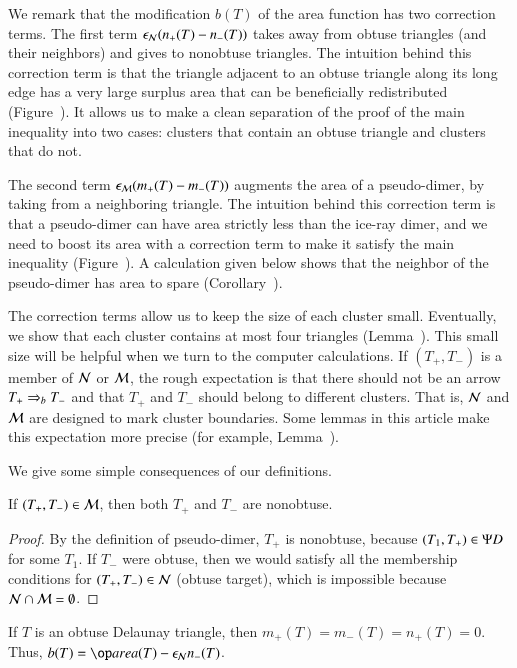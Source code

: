 We remark that the modification $b(T)$ of the area function has two
correction terms.  The first term $\epsilon_{\mathcal N} (n_+(T) - n_-(T))$ takes away
from obtuse triangles (and their neighbors) and gives to nonobtuse
triangles.  The intuition behind this correction term is that the
triangle adjacent to an obtuse triangle along its long edge has a very
large surplus area that can be beneficially redistributed
(Figure~).  It allows us to make a clean separation of
the proof of the main inequality into two cases: clusters that contain
an obtuse triangle and clusters that do not.

The second term $\epsilon_{\mathcal M} (m_+(T) - m_-(T))$ augments the area of a
pseudo-dimer, by taking from a neighboring triangle.  The intuition
behind this correction term is that a pseudo-dimer can have area
strictly less than the ice-ray dimer, and we need to boost its area
with a correction term to make it satisfy the main inequality
(Figure~).  A calculation given below shows that
the neighbor of the pseudo-dimer has area to spare
(Corollary~).

The correction terms allow us to keep the size of each cluster small.
Eventually, we show that each cluster contains at most four triangles
(Lemma~).  This small size will be helpful when we
turn to the computer calculations.  If $(T_+,T_-)$ is a member of $\mathcal N$
or $\mathcal M$, the rough expectation is that there should not be an arrow
$T_+\Rightarrow_{b} T_-$ and that $T_+$ and $T_-$ should belong to different
clusters.  That is, $\mathcal N$ and $\mathcal M$ are designed to mark cluster
boundaries.  Some lemmas in this article make this expectation more
precise (for example, Lemma~).

We give some simple consequences of our definitions.

\begin{lemma} 
  If $(T_+,T_-)\in \mathcal M$, then both $T_+$ and $T_-$ are nonobtuse.
\end{lemma}

\begin{proof} 
  By the definition of pseudo-dimer, $T_+$ is nonobtuse, because
  $(T_1,T_+)\in\Psi D$ for some $T_1$.  If $T_-$ were obtuse, then we
  would satisfy all the membership conditions for $(T_+,T_-)\in \mathcal N$
  (obtuse target), which is impossible because $\mathcal N\cap \mathcal M =
  \emptyset$.
\end{proof}

\begin{lemma}[obtuse $b$] 
  If $T$ is an obtuse Delaunay triangle, then
  $m_+(T)=m_-(T)=n_+(T)=0$.  Thus, $b(T) = \area(T) - \epsN n_-(T)$.
\end{lemma}

